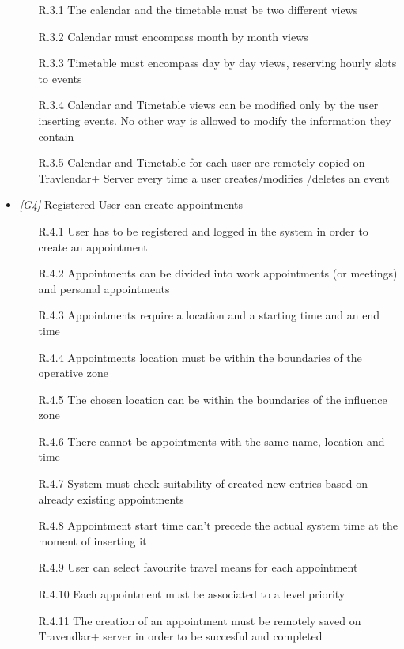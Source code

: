 \begin{itemize}
                  \begin{itemize}
                  
                  \item [R.3.1] The calendar and the timetable must be two different views 
                  \item [R.3.2] Calendar must encompass month by month views
                  \item [R.3.3] Timetable must encompass day by day views, reserving hourly slots to events
                  \item [R.3.4] Calendar and Timetable views can be modified only by the user inserting events. No other way is allowed to modify the information they contain
                  \item [R.3.5] Calendar and Timetable for each user are remotely copied on Travlendar+ Server every time a user creates/modifies /deletes an event
                        
                  \end{itemize}
                  
\item \textit{[G4]} Registered User can create appointments 

 \begin{itemize}
                        \item [R.4.1] User has to be registered and logged in the system in order to create an
appointment
                        \item [R.4.2] Appointments can be divided into work appointments (or meetings) and personal appointments
                        \item [R.4.3] Appointments require a location and a starting time and an end time
                        \item [R.4.4] Appointments location must be within the boundaries of the operative zone
                        \item [R.4.5] The chosen location can be within the boundaries of the influence zone
                        \item [R.4.6] There cannot be appointments with the same name, location and time
                        \item [R.4.7] System must check suitability of created new entries based on already existing appointments
                        \item [R.4.8] Appointment start time can't precede the actual system time at the moment of inserting it                                 														\item [R.4.9] User can select favourite travel means for each appointment
                        \item [R.4.10] Each appointment must be associated to a level priority
                        \item [R.4.11] The creation of an appointment must be remotely saved on Travendlar+ server in order to be succesful and completed
                        

\end{itemize}
\end{itemize}

